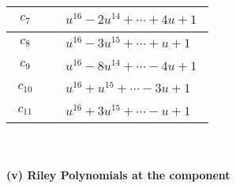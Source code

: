 \documentclass[1p]{elsarticle_modified}
\theoremstyle{definition}
\begin{document}
\begin{tabular}{m{50pt}|m{274pt}}
\hline $$\begin{aligned}c_{7}\end{aligned}$$&$\begin{aligned}
&u^{16}-2 u^{14}+\cdots+4 u+1
\end{aligned}$\\
\hline $$\begin{aligned}c_{8}\end{aligned}$$&$\begin{aligned}
&u^{16}-3 u^{15}+\cdots+u+1
\end{aligned}$\\
\hline $$\begin{aligned}c_{9}\end{aligned}$$&$\begin{aligned}
&u^{16}-8 u^{14}+\cdots-4 u+1
\end{aligned}$\\
\hline $$\begin{aligned}c_{10}\end{aligned}$$&$\begin{aligned}
&u^{16}+u^{15}+\cdots-3 u+1
\end{aligned}$\\
\hline $$\begin{aligned}c_{11}\end{aligned}$$&$\begin{aligned}
&u^{16}+3 u^{15}+\cdots- u+1
\end{aligned}$\\
\hline
\end{tabular}\\~\\
\newpage\renewcommand{\arraystretch}{1}
\flushleft \textbf{(v) Riley Polynomials at the component}\newline \\
\end{document}
